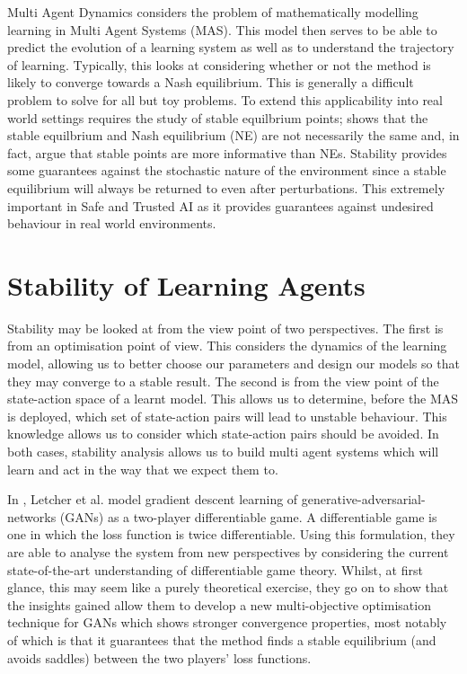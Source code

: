 \documentclass[preprint,11pt]{report}
\begin{document}
Multi Agent Dynamics considers the problem of mathematically modelling learning in Multi Agent
Systems (MAS). This model then serves to be able to predict the evolution of a learning system as
well as to understand the trajectory of learning. Typically, this looks at considering whether or
not the method is likely to converge towards a Nash equilibrium. This is generally a difficult
problem to solve \cite{ShohamMultiagentFoundations} for all but toy problems. To extend this
applicability into real world settings requires the study of stable equilbrium points;
\cite{Letcher2019DifferentiableMechanics} shows that the stable equilbrium and Nash equilibrium (NE)
are not necessarily the same and, in fact, argue that stable points are more informative than NEs.
Stability provides some guarantees against the stochastic nature of the environment since a stable
equilibrium will always be returned to even after perturbations. This extremely important in Safe
and Trusted AI as it provides guarantees against undesired behaviour in real world
environments. 

\section{Stability of Learning Agents}

Stability may be looked at from the view point of two perspectives. The first is from an
optimisation point of view. This considers the dynamics of the learning model, allowing us to better
choose our parameters and design our models so that they may converge to a stable result. The second
is from the view point of the state-action space of a learnt model. This allows us to determine,
before the MAS is deployed, which set of state-action pairs will lead to unstable behaviour. This
knowledge allows us to consider which state-action pairs should be avoided. In both cases, stability
analysis allows us to build multi agent systems which will learn and act in the way that we expect
them to.

In \cite{Letcher2019DifferentiableMechanics}, Letcher et al. model gradient descent learning of
generative-adversarial-networks (GANs) as a two-player differentiable game. A differentiable game is
one in which the loss function is twice differentiable. Using this formulation, they are able to
analyse the system from new perspectives by considering the current state-of-the-art understanding
of differentiable game theory. Whilst, at first glance, this may seem like a purely theoretical
exercise, they go on to show that the insights gained allow them to develop a new multi-objective
optimisation technique for GANs which shows stronger convergence properties, most notably of which
is that it guarantees that the method finds a stable equilibrium (and avoids saddles) between the
two players' loss functions.
\end{document}
